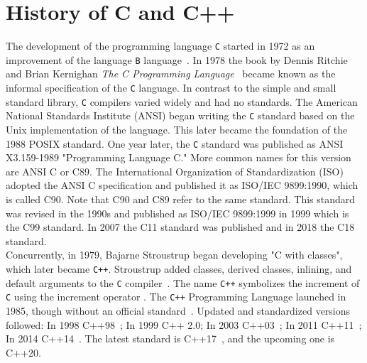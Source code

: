 \section{History of C and C++}
The development of the programming language \texttt{C} started in 1972 as an improvement of the language \texttt{B} language~\cite{ritchie1993development}. In 1978 the book by Dennis Ritchie and Brian Kernighan \textit{The C Programming Language}~\cite{kernighan2006c} became known as the informal specification of the \texttt{C} language. In contrast to the simple and small standard library, \texttt{C} compilers varied widely and had no standards. The American National Standards Institute (ANSI) began writing the \texttt{C} standard based on the Unix implementation of the language. This later became the foundation of the 1988 POSIX standard. One year later, the \texttt{C} standard was published as ANSI X3.159-1989 "Programming Language C." More common names for this version are ANSI C or C89. The International Organization of Standardization (ISO) adopted the ANSI C specification and published it as ISO/IEC 9899:1990, which is called C90. Note that C90 and C89 refer to the same standard. This standard was revised in the 1990s and published as ISO/IEC 9899:1999 in 1999 which is the C99 standard. In 2007 the C11 standard was published and in 2018 the C18 standard.\\

Concurrently, in 1979, Bajarne Stroustrup began developing "C with classes", which later became \texttt{C++}. Stroustrup added classes, derived classes, inlining, and default arguments to the \texttt{C} compiler~\cite{stroustrup1996history}. The name \texttt{C++} symbolizes the increment of \texttt{C} using the increment operator \cpp{++}. The \texttt{C++} Programming Language launched in 1985, though without an official standard~\cite{stroustrup2000c++}. Updated and standardized versions followed: In 1998 C++98~\cite{koenig1998standard}; In 1999 C++ 2.0; In 2003 C++03~\cite{c++2003iso}; In 2011 C++11~\cite{c++2011iso}; In 2014 C++14~\cite{c++2014iso}. The latest standard is C++17~\cite{smith2017iso}, and the upcoming one is C++20.

